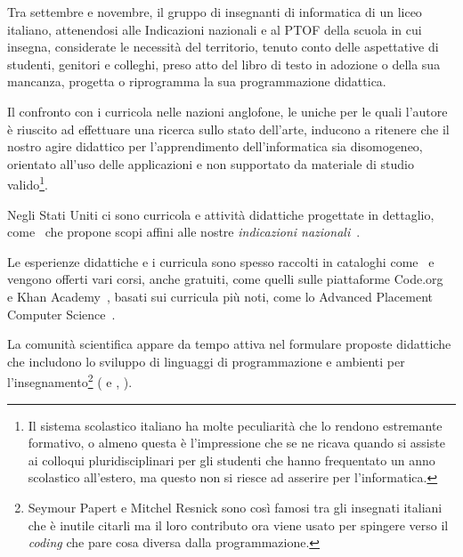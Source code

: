 \documentclass[a4paper]{easychair}
\begin{document}
Tra settembre e novembre, il gruppo di insegnanti di informatica di un liceo italiano,
attenendosi alle Indicazioni nazionali e al PTOF della scuola in cui insegna,
considerate le necessità del territorio,
tenuto conto delle aspettative di studenti, genitori e colleghi,
preso atto del libro di testo in adozione o della sua mancanza, 
progetta o riprogramma la sua programmazione didattica.

Il confronto con i curricola nelle nazioni anglofone, le uniche per le quali l'autore è riuscito ad effettuare
una ricerca sullo stato dell'arte, inducono a ritenere che il nostro agire didattico per l'apprendimento dell'informatica
sia disomogeneo, orientato all'uso delle applicazioni e non supportato da materiale di studio valido\footnote{%
Il sistema scolastico italiano ha molte peculiarità che lo rendono estremante formativo, o almeno questa è l'impressione che se ne ricava quando si assiste ai colloqui pluridisciplinari per gli studenti che hanno frequentato un anno scolastico all'estero, ma questo non si riesce ad asserire per l'informatica.}.



Negli Stati Uniti ci sono curricola e attività didattiche progettate in
dettaglio, come~\cite{Fisler2021} che propone scopi affini
alle nostre \textit{indicazioni nazionali}~\cite{IlMinistro2010}.

Le esperienze didattiche e i curricula sono spesso raccolti in cataloghi come~\cite{cs4all} e
vengono offerti vari corsi, anche gratuiti, come quelli sulle piattaforme Code.org~\cite{codeorg}
e Khan Academy~\cite{khan-academy}, basati sui curricula più noti, come lo Advanced Placement Computer Science~\cite{ap-csp}.

La comunità scientifica appare da tempo attiva nel formulare proposte didattiche che includono lo sviluppo
di linguaggi di programmazione e ambienti per l'insegnamento\footnote{%
Seymour Papert e Mitchel Resnick sono così famosi tra gli insegnati italiani che è inutile citarli ma il loro contributo ora viene usato per spingere verso il \textit{coding} che pare cosa diversa dalla programmazione.} %
(\cite{Abelson1996} e \cite{Abelson2022}, \cite{Felleisen2018}). 
\end{document}
